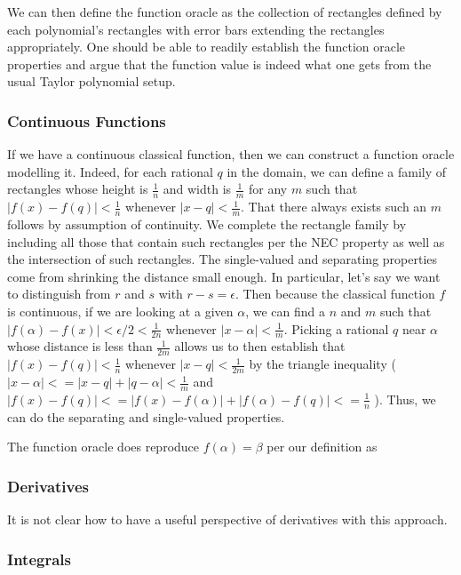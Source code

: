 \documentclass[12pt]{article}
\theoremstyle{remark}
\begin{document}
We can then define the function oracle as the collection of rectangles defined by each polynomial's rectangles with error bars extending the rectangles appropriately. One should be able to readily establish the function oracle properties and argue that the function value is indeed what one gets from the usual Taylor polynomial setup. 

\subsubsection{Continuous Functions}

If we have a continuous classical function, then we can construct a function oracle modelling it. Indeed, for each rational $q$ in the domain, we can define a family of rectangles whose height is $\frac{1}{n}$ and width is $\frac{1}{m}$ for any $m$ such that $|f(x) - f(q)| < \frac{1}{n}$ whenever $|x-q| < \frac{1}{m}$. That there always exists such an $m$ follows by assumption of continuity. We complete the rectangle family by including all those that contain such rectangles per the NEC property as well as the intersection of such rectangles. The single-valued and separating properties come from shrinking the distance small enough.  In particular, let's say we want to distinguish from $r$ and $s$ with $r-s = \epsilon$. Then because the classical function $f$ is continuous, if we are looking at a given $\alpha$, we can find a $n$ and $m$ such that $|f(\alpha) - f(x)| < \epsilon/2< \frac{1}{2n}$ whenever $|x - \alpha| < \frac{1}{m}$. Picking a rational $q$ near $\alpha$ whose distance is less than $\frac{1}{2m}$ allows us to then establish that $|f(x)-f(q)| < \frac{1}{n}$ whenever $|x-q| < \frac{1}{2m}$ by the triangle inequality ( $|x-\alpha| <= |x -q | + |q - \alpha| <\frac{1}{m}$ and $|f(x) - f(q)| <= |f(x) - f(\alpha)| + |f(\alpha) - f(q)| <= \frac{1}{n}$ ).  Thus, we can do the separating and single-valued properties. 

The function oracle does reproduce $f(\alpha) = \beta$ per our definition as 


\subsubsection{Derivatives}

It is not clear how to have a useful perspective of derivatives with this approach. 

\subsubsection{Integrals}
\end{document}
